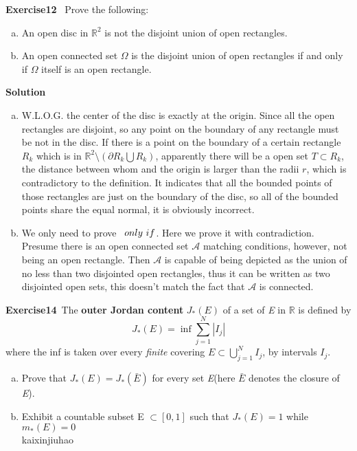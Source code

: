 \documentclass{article}
\begin{document}
\Large{\textbf{Exercise12}} \ Prove the following:
\begin{enumerate}[(a)]
	\item An open disc in $\mathbb{R}^2$  is not the disjoint union of open rectangles.
	\item An open connected set $\Omega$ is the disjoint union of open rectangles if and only if  $\Omega$  itself is an open rectangle.
\end{enumerate} 
\Large{\textbf{Solution}}\
	\begin{enumerate}[(a)]
		\item W.L.O.G. the center of the disc is exactly at the origin. Since all the open rectangles are disjoint, so any point on the boundary of any rectangle must be not in the disc. If there is a point on the boundary of a certain rectangle $R_k$ which is in $\mathbb{R}^2 \setminus (\partial R_k \bigcup R_k)$, apparently there will be a open set $T \subset R_k$, the distance between whom and the origin is larger than the radii $r$, which is contradictory to the definition. It indicates that all the bounded points of those rectangles are just on the boundary of the disc, so all of the bounded points share the equal normal, it is obviously incorrect.
		\item We only need to prove \ $\mathnormal{only\ if}$. Here we prove it with contradiction. Presume there is an open connected set $\mathcal{A}$ matching conditions, however, not being an open rectangle. Then $\mathcal{A}$ is capable of being depicted as the union of no less than two disjointed open rectangles, thus it can be written as two disjointed open sets, this doesn't match the fact that $\mathcal{A}$ is connected.   
	\end{enumerate}

\Large{\textbf{Exercise14}}\ The \textbf{outer Jordan content} $J_{*}(E)$ of a set of \emph{E} in $\mathbb{R}$ is defined by 
\[J_{*}(E) = \inf\sum^{N}_{j = 1}|I_j|\] 
where the inf is taken over every \emph{finite} covering $E\subset \bigcup^N_{j=1}I_j$, by intervals $I_j$.
\begin{enumerate}[(a)]
	\item Prove that $J_{*}(E) = J_{*}(\bar{E})$ for every set \emph{E}(here $\bar{E}$ denotes the closure of \emph{E}).
	\item Exhibit a countable subset E $\subset [0,1]$ such that $J_{*}(E) = 1$ while $m_{*}(E) = 0$ \\
  kaixinjiuhao
\end{enumerate}
\end{document}
